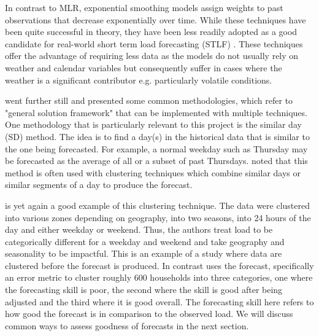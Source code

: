 In contrast to MLR, exponential smoothing models assign weights to past observations that decrease exponentially over time. While these techniques have been quite successful in theory, they have been less readily adopted as a good candidate for real-world short term load forecasting (STLF) \citep{hong16}. These techniques offer the advantage of requiring less data as the models do not usually rely on weather and calendar variables but consequently suffer in cases where the weather is a significant contributor e.g. particularly volatile conditions.

\citet{hong16} went further still and presented some common methodologies, which refer to "general solution framework" that can be implemented with multiple techniques. One methodology that is particularly relevant to this project is the similar day (SD) method. The idea is to find a day(s) in the historical data that is similar to the one being forecasted. For example, a normal weekday such as Thursday may be forecasted as the average of all or a subset of past Thursdays. \citet{hong16} noted that this method is often used with clustering techniques which combine similar days or similar segments of a day to produce the forecast.

\citet{char14} is yet again a good example of this clustering technique. The data were clustered into various zones depending on geography, into two seasons, into 24 hours of the day and either weekday or weekend. Thus, the authors treat load to be categorically different for a weekday and weekend and take geography and seasonality to be impactful. This is an example of a study where data are clustered before the forecast is produced. In contrast \cite{dan14} uses the forecast, specifically an error metric to cluster roughly 600 households into three categories, one where the forecasting skill is poor, the second where the skill is good after being adjusted and the third where it is good overall. The forecasting skill here refers to how good the forecast is in comparison to the observed load. We will discuss common ways to assess goodness of forecasts in the next section.

